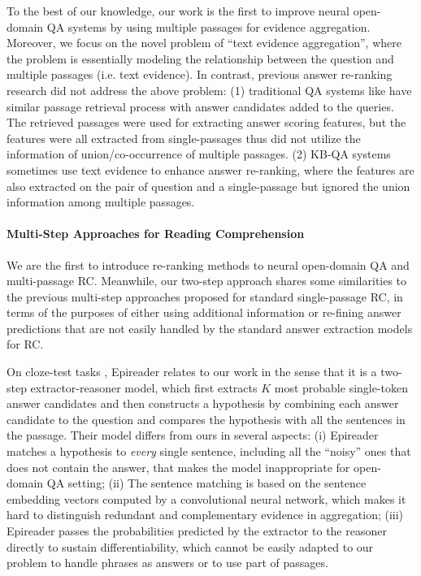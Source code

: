\documentclass{article} \usepackage{iclr2018_conference,times}
\begin{document}
To the best of our knowledge, our work is the first to improve neural open-domain QA systems by using multiple passages for evidence aggregation.
Moreover, we focus on the novel problem of ``text evidence aggregation'', where the problem is essentially modeling the relationship between the question and multiple passages (i.e. text evidence).
In contrast, previous answer re-ranking research did not address the above problem: (1) traditional QA systems like \citep{ferrucci2010building} have similar passage retrieval process with answer candidates added to the queries. The retrieved passages were used for extracting answer scoring features, but the features were all extracted from single-passages thus did not utilize the information of union/co-occurrence of multiple passages. (2) KB-QA systems \citep{bast2015more,yih-EtAl:2015:ACL-IJCNLP,xu-EtAl:2016:P16-1} sometimes use text evidence to enhance answer re-ranking, where the features are also extracted on the pair of question and a single-passage but ignored the union information among multiple passages.


\paragraph{Multi-Step Approaches for Reading Comprehension}
We are the first to introduce re-ranking methods to neural open-domain QA and multi-passage RC. 
Meanwhile, our two-step approach shares some similarities to the previous multi-step approaches proposed for standard single-passage RC, in terms of the purposes of either using additional information or re-fining answer predictions that are not easily handled by the standard answer extraction models for RC.

On cloze-test tasks \citep{hermann2015teaching},
Epireader \citet{trischler2016natural} relates to our work in the sense that it is a two-step extractor-reasoner model, which first extracts $K$ most probable single-token answer candidates and then constructs a hypothesis by combining each answer candidate to the question and compares the hypothesis with all the sentences in the passage.
Their model differs from ours in several aspects: (i) Epireader matches a hypothesis to \emph{every} single sentence, including all the ``noisy'' ones that does not contain the answer, that makes the model inappropriate for open-domain QA setting; 
(ii) The sentence matching is based on the sentence embedding vectors computed by a convolutional neural network, which makes it hard to distinguish redundant and complementary evidence in aggregation; 
(iii) Epireader passes the probabilities predicted by the extractor to the reasoner directly to sustain differentiability, which cannot be easily adapted to our problem to handle phrases as answers or to use part of passages.
\end{document}
